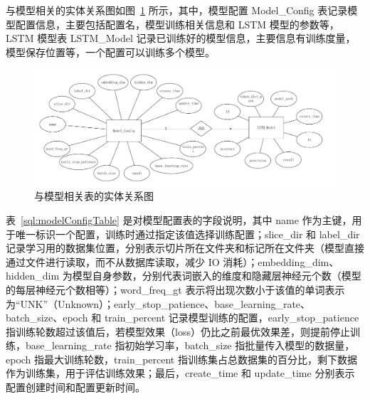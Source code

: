与模型相关的实体关系图如图~\ref{er:model} 所示，其中，模型配置 Model\_Config 表记录模型配置信息，主要包括配置名，模型训练相关信息和 LSTM 模型的参数等，LSTM 模型表 LSTM\_Model 记录已训练好的模型信息，主要信息有训练度量，模型保存位置等，一个配置可以训练多个模型。

\begin{figure}[!htbp]
	\centering
	\includegraphics[width=1\linewidth]{FIGs/chapter3/model_er.pdf}
    \vspace{-0.5cm}
	\caption{与模型相关表的实体关系图}\label{er:model}
    \vspace{-0.5cm}
\end{figure}

 表~\ref{sql:modelConfigTable} 是对模型配置表的字段说明，其中 name 作为主键，用于唯一标识一个配置，训练时通过指定该值选择训练配置；slice\_dir 和 label\_dir 记录学习用的数据集位置，分别表示切片所在文件夹和标记所在文件夹（模型直接通过文件进行读取，而不从数据库读取，减少 IO 消耗）；embedding\_dim、hidden\_dim 为模型自身参数，分别代表词嵌入的维度和隐藏层神经元个数（模型的每层神经元个数相等）；word\_freq\_gt 表示将出现次数小于该值的单词表示为“UNK”（Unknown）；early\_stop\_patience、base\_learning\_rate、batch\_size、epoch 和 train\_percent 记录模型训练的配置，early\_stop\_patience 指训练轮数超过该值后，若模型效果（loss）仍比之前最优效果差，则提前停止训练，base\_learning\_rate 指初始学习率，batch\_size 指批量传入模型的数据量，epoch 指最大训练轮数，train\_percent 指训练集占总数据集的百分比，剩下数据作为训练集，用于评估训练效果；最后，create\_time 和 update\_time 分别表示配置创建时间和配置更新时间。

